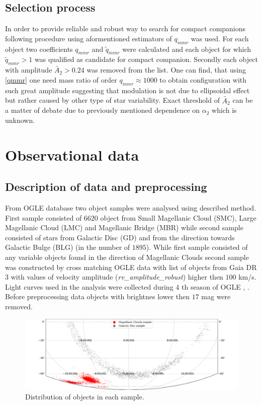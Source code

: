 \documentclass{pracalicmgr}
\begin{document}
\section{Selection process}
In order to provide reliable and robust way to search for compact companions following procedure using aformentioned estimators of $q_{mmr}$ was used.
For each object two coefficients $q_{mmr}$ and $\tilde{q}_{mmr}$ were calculated and each object for which $\tilde{q}_{mmr}>1$ was qualified as candidate for compact companion.
Secondly each object with amplitude $\tilde{A_2}>0.24$ was removed from the list. One can find, that using \ref{qmmr} one need mass ratio of order $q_{mmr}\approx 1000$
to obtain configuration with such great amplitude 
suggesting that modulation is not due to ellipsoidal effect but rather caused by other type of star variability. Exact threshold of $\tilde{A_2}$ can be a matter of debate due to 
previously mentioned dependence on $\alpha_2$ which is unknown. 

\chapter{Observational data}
\section{Description of data and preprocessing}
From OGLE database two object samples were analysed using described method. First sample consisted of $6620$ object from Small Magellanic Cloud (SMC), Large Magellanic Cloud (LMC) and 
Magellanic Bridge  (MBR) while second sample consisted of stars from Galactic Disc (GD) and from the direction towards Galactic Bulge (BLG) (in the number of $1895$). While first sample consisted 
of any variable objects found in the direction of Magellanic Clouds second sample was constructed by cross matching OGLE data with list of objects from Gaia DR 3 \citep{gaia_collaboration_gaia_2022} with values of 
velocity amplitude ({\it{rv\_amplitude\_robust}}) higher then $100$ km/s. Light curves used in the analysis were collected during $4$ th season of OGLE \citep{udalski_ogle-iv_2015}, \citep{udalski_optical_1992}. Before preprocessing data objects with brightnes lower then
$17$ mag  were removed. 

\begin{figure}[H]
    \begin{center}
        \includegraphics[scale=0.38]{plots/map_sample.png}
    \end{center}
    \caption{Distribution of objects in each sample.}
\end{figure}
\end{document}
